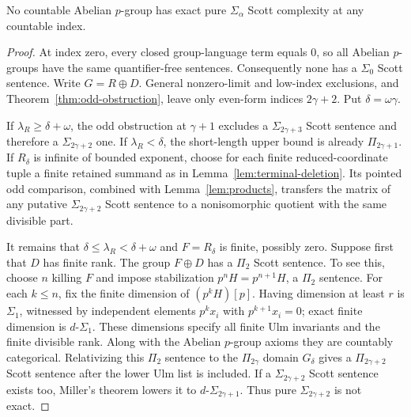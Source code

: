 \documentclass[11pt]{article}
\begin{document}
\begin{theorem}
\label{thm:no-pure-sigma}
No countable Abelian $p$-group has exact pure
$\Sigma_\alpha$ Scott complexity at any countable index.
\end{theorem}

\begin{proof}
At index zero, every closed group-language term equals $0$, so
all Abelian $p$-groups have the same quantifier-free sentences.
Consequently none has a $\Sigma_0$ Scott sentence.
Write $G=R\oplus D$. General nonzero-limit and low-index exclusions, and
Theorem~\ref{thm:odd-obstruction}, leave only even-form
indices $2\gamma+2$. Put $\delta=\omega\gamma$.

If $\lambda_R\ge\delta+\omega$, the odd obstruction at
$\gamma+1$ excludes a $\Sigma_{2\gamma+3}$ Scott sentence and
therefore a $\Sigma_{2\gamma+2}$ one. If $\lambda_R<\delta$,
the short-length upper bound is already $\Pi_{2\gamma+1}$.
If $R_\delta$ is infinite of bounded exponent, choose for each
finite reduced-coordinate tuple a finite retained summand as in
Lemma~\ref{lem:terminal-deletion}. Its pointed odd comparison,
combined with Lemma~\ref{lem:products}, transfers the matrix of any
putative $\Sigma_{2\gamma+2}$ Scott sentence to a nonisomorphic quotient
with the same divisible part.

It remains that $\delta\le\lambda_R<\delta+\omega$ and
$F=R_\delta$ is finite, possibly zero. Suppose first that $D$ has
finite rank. The group $F\oplus D$ has a $\Pi_2$ Scott sentence.
To see this, choose $n$ killing $F$ and impose stabilization
$p^nH=p^{n+1}H$, a $\Pi_2$ sentence. For each $k\le n$, fix the
finite dimension of $(p^kH)[p]$. Having dimension at least $r$ is
$\Sigma_1$, witnessed by independent elements $p^kx_i$ with
$p^{k+1}x_i=0$; exact finite dimension is $d\text{-}\Sigma_1$.
These dimensions specify all finite Ulm invariants and the finite
divisible rank. Along with the Abelian $p$-group axioms they are
countably categorical. Relativizing this $\Pi_2$ sentence to the
$\Pi_{2\gamma}$ domain $G_\delta$ gives a
$\Pi_{2\gamma+2}$ Scott sentence after the lower Ulm list is
included. If a $\Sigma_{2\gamma+2}$ Scott sentence exists too,
Miller's theorem lowers it to $d\text{-}\Sigma_{2\gamma+1}$.
Thus pure $\Sigma_{2\gamma+2}$ is not exact.


\end{proof}
\end{document}
